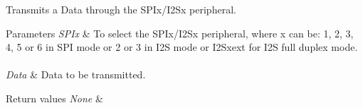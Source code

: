 Transmits a Data through the S\+P\+Ix/\+I2\+Sx peripheral. 


\begin{DoxyParams}{Parameters}
{\em S\+P\+Ix} & To select the S\+P\+Ix/\+I2\+Sx peripheral, where x can be\+: 1, 2, 3, 4, 5 or 6 in S\+PI mode or 2 or 3 in I2S mode or I2\+Sxext for I2S full duplex mode. ~\newline
\\
\hline
{\em Data} & Data to be transmitted. \\
\hline
\end{DoxyParams}

\begin{DoxyRetVals}{Return values}
{\em None} & \\
\hline
\end{DoxyRetVals}

